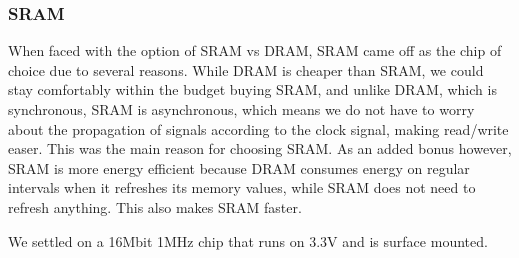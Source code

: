 
\subsubsection{SRAM}

When faced with the option of SRAM vs DRAM, SRAM came off as the chip of choice
due to several reasons. While DRAM is cheaper than SRAM, we could stay
comfortably within the budget buying SRAM,
and unlike DRAM, which is synchronous, SRAM is asynchronous, which means we do
not have to worry about the propagation of signals according to the clock
signal, making read/write easer. This was the main reason for choosing SRAM. As
an added bonus however, SRAM is more energy efficient because DRAM consumes
energy on regular intervals when it refreshes its memory values, while SRAM does
not need to refresh anything. This also makes SRAM faster.

We settled on a 16Mbit 1MHz chip that runs on 3.3V and is surface mounted.